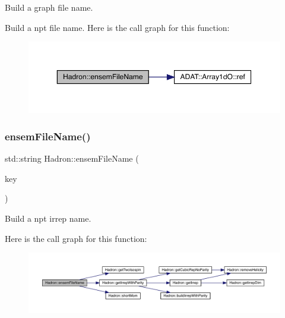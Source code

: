 Build a graph file name. 

Build a npt file name. Here is the call graph for this function\+:
\nopagebreak
\begin{figure}[H]
\begin{center}
\leavevmode
\includegraphics[width=350pt]{d1/daf/namespaceHadron_a427c61121d387abc689b090161709921_cgraph}
\end{center}
\end{figure}
\mbox{\label{namespaceHadron_a21a0c1cea8de6f0c457f10e22cd3d251}} 
\subsubsection{\texorpdfstring{ensemFileName()}{ensemFileName()}\hspace{0.1cm}{\footnotesize\ttfamily [6/12]}}
{\footnotesize\ttfamily std\+::string Hadron\+::ensem\+File\+Name (\begin{DoxyParamCaption}\item[{const \mbox{\hyperlink{structHadron_1_1KeyHadronNPartIrrep__t}{Hadron\+::\+Key\+Hadron\+N\+Part\+Irrep\+\_\+t}} \&}]{key }\end{DoxyParamCaption})}



Build a npt irrep name. 

Here is the call graph for this function\+:
\nopagebreak
\begin{figure}[H]
\begin{center}
\leavevmode
\includegraphics[width=350pt]{d1/daf/namespaceHadron_a21a0c1cea8de6f0c457f10e22cd3d251_cgraph}
\end{center}
\end{figure}
\mbox{\label{namespaceHadron_ac1f8513c22ed958fc79537d0cfc00e1f}} 

